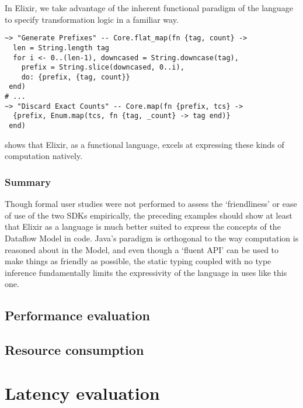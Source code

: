 \begin{codelisting}
	\caption[Using lambdas to specify transformation logic in Elixir.]{In Elixir, we take advantage of the inherent functional paradigm of the language to specify transformation logic in a familiar way.}
	\label{lst:eval:twitter-lambdas-elixir}
	\begin{verbatim}
~> "Generate Prefixes" -- Core.flat_map(fn {tag, count} ->
  len = String.length tag
  for i <- 0..(len-1), downcased = String.downcase(tag),
    prefix = String.slice(downcased, 0..i),
    do: {prefix, {tag, count}}
 end)
# ...
~> "Discard Exact Counts" -- Core.map(fn {prefix, tcs} ->
  {prefix, Enum.map(tcs, fn {tag, _count} -> tag end)}
 end)
	\end{verbatim}
\end{codelisting}

 shows that Elixir, as a functional language, excels at expressing these kinds of computation natively.

\subsubsection{Summary}

Though formal user studies were not performed to assess the `friendliness' or ease of use of the two SDKs empirically, the preceding examples should show at least that Elixir as a language is much better suited to express the concepts of the Dataflow Model in code.
Java's paradigm is orthogonal to the way computation is reasoned about in the Model, and even though a `fluent API' can be used to make things as friendly as possible, the static typing coupled with no type inference fundamentally limits the expressivity of the language in uses like this one.


\subsection{Performance evaluation}\label{sec:eval:performance}

\subsection{Resource consumption}\label{sec:eval:resource}

\section{Latency evaluation}\label{sec:eval:latency}

